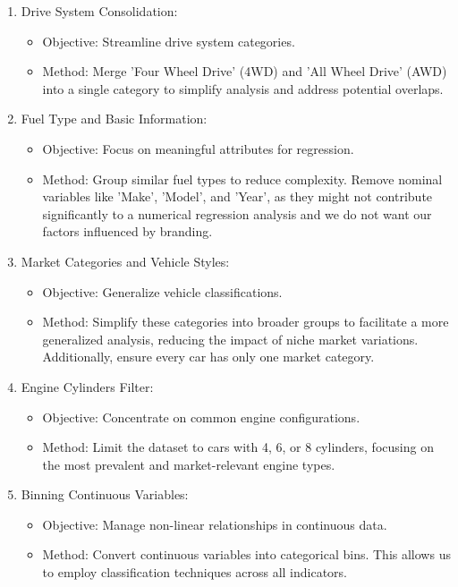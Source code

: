 \documentclass{article}
\begin{document}
\begin{enumerate}
    \item Drive System Consolidation:
    \begin{itemize}
        \item Objective: Streamline drive system categories.
        \item Method: Merge 'Four Wheel Drive' (4WD) and 'All Wheel Drive' (AWD) into a single category to simplify analysis and address potential overlaps.
    \end{itemize}
    
    \item Fuel Type and Basic Information:
    \begin{itemize}
        \item Objective: Focus on meaningful attributes for regression.
        \item Method: Group similar fuel types to reduce complexity. Remove nominal variables like 'Make', 'Model', and 'Year', as they might not contribute significantly to a numerical regression analysis and we do not want our factors influenced by branding.
    \end{itemize}
    
    \item Market Categories and Vehicle Styles:
    \begin{itemize}
        \item Objective: Generalize vehicle classifications.
        \item Method: Simplify these categories into broader groups to facilitate a more generalized analysis, reducing the impact of niche market variations. Additionally, ensure every car has only one market category.
    \end{itemize}
    
    \item Engine Cylinders Filter:
    \begin{itemize}
        \item Objective: Concentrate on common engine configurations.
        \item Method: Limit the dataset to cars with 4, 6, or 8 cylinders, focusing on the most prevalent and market-relevant engine types.
    \end{itemize}
    
    \item Binning Continuous Variables:
    \begin{itemize}
        \item Objective: Manage non-linear relationships in continuous data.
        \item Method: Convert continuous variables into categorical bins. This allows us to employ classification techniques across all indicators.
    \end{itemize}
    

\end{enumerate}
\end{document}

